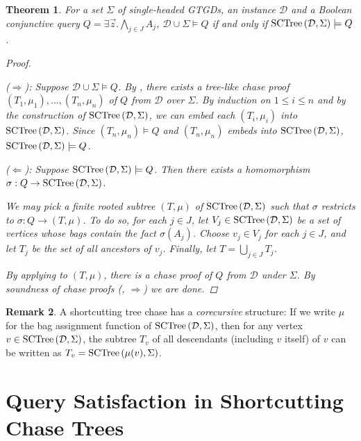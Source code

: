 \documentclass[12pt]{report}
\theoremstyle{plain}
\newtheorem{theorem}{Theorem}[chapter]
\theoremstyle{definition}
\newtheorem{remark}[theorem]{Remark}
\newcommand{\SCTree}[2]{\ensuremath{\normalfont{\textrm{SCTree}} \left( #1, #2 \right)}}
\begin{document}
\begin{theorem}
\label{sctree-soundness-completeness}
  For a set $\Sigma$ of single-headed GTGDs, an instance $\mathcal{D}$ and a Boolean conjunctive query $Q = \exists \vec{z}. \bigwedge_{j \in J} A_j$, $\mathcal{D} \cup \Sigma \models Q$ if and only if $\SCTree{\mathcal{D}}{\Sigma} \models Q$.
  \begin{proof}[Proof] $ $\par
    ($\Longrightarrow$): Suppose $\mathcal{D} \cup \Sigma \models Q$. By , there exists a tree-like chase proof $(T_1, \mu_1), \ldots, (T_n, \mu_n)$ of $Q$ from $\mathcal{D}$ over $\Sigma$. By induction on $1 \leq i \leq n$ and by the construction of $\SCTree{\mathcal{D}}{\Sigma}$, we can embed each $(T_i, \mu_i)$ into $\SCTree{\mathcal{D}}{\Sigma}$. Since $(T_n, \mu_n) \models Q$ and $(T_n, \mu_n)$ embeds into $\SCTree{\mathcal{D}}{\Sigma}$, $\SCTree{\mathcal{D}}{\Sigma} \models Q$.

    ($\Longleftarrow$): Suppose $\SCTree{\mathcal{D}}{\Sigma} \models Q$. Then there exists a homomorphism $\sigma:\nobreak Q \rightarrow \SCTree{\mathcal{D}}{\Sigma}$.
    
    We may pick a finite rooted subtree $(T, \mu)$ of $\SCTree{\mathcal{D}}{\Sigma}$ such that $\sigma$ restricts to $\sigma: Q \rightarrow (T, \mu)$. To do so, for each $j \in J$, let $V_j \in \SCTree{\mathcal{D}}{\Sigma}$ be a set of vertices whose bags contain the fact $\sigma(A_j)$. Choose $v_j \in V_j$ for each $j \in J$, and let $T_j$ be the set of all ancestors of $v_j$. Finally, let $T = \bigcup_{j \in J} T_j$.

    By applying  to $(T, \mu)$, there is a chase proof of $Q$ from $\mathcal{D}$ under $\Sigma$. By soundness of chase proofs (, $\Longrightarrow$) we are done.
  \end{proof}
\end{theorem}

\begin{remark}
\label{corecursiveness-of-sctree}
  A shortcutting tree chase has a \emph{corecursive} structure: If we write $\mu$ for the bag assignment function of $\SCTree{\mathcal{D}}{\Sigma}$, then for any vertex $v \in \SCTree{\mathcal{D}}{\Sigma}$, the subtree $T_v$ of all descendants (including $v$ itself) of $v$ can be written as $T_v = \SCTree{\mu(v)}{\Sigma}$.
\end{remark}

\section{Query Satisfaction in Shortcutting Chase Trees}
\end{document}
